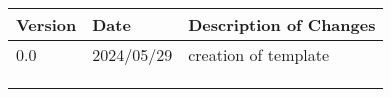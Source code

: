 
\begin{table}[H]
	\begin{center}
		\label{tab:rev}
		\begin{tabular}{|p{}|p{}||p{}|}
			\hline 
			\textbf{Version} & \textbf{Date} & \textbf{Description of Changes}		\\ \hline
			0.0 & 2024/05/29 & creation of template			\\ \hline
			&  & 									\\ \hline
			&  & 									\\ \hline
			&  & 									\\ \hline
		\end{tabular}
	\end{center}
\end{table}	